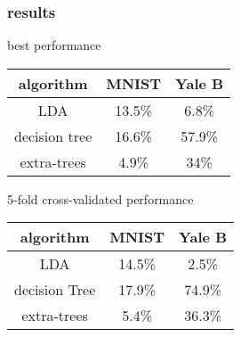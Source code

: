 \begin{frame}
  \frametitle{results}

best performance
  \begin{table}[H]
  \centering
  \begin{tabular}{||c | c | c||} 
    \hline
    algorithm & MNIST & Yale B \\
    \hline\hline
    LDA & 13.5\%  & 6.8\% \\ 
    \hline
    decision tree & 16.6\% & 57.9\% \\ 
    \hline
    extra-trees & 4.9\% & 34\% \\
    \hline
  \end{tabular}
\end{table}
5-fold cross-validated performance
%
\begin{table}[H]
  \centering
  \begin{tabular}{||c | c | c||} 
    \hline
    algorithm & MNIST & Yale B \\
    \hline\hline
    LDA & 14.5\%  & 2.5\% \\ 
    \hline
    decision Tree & 17.9\% & 74.9\% \\ 
    \hline
    extra-trees & 5.4\% & 36.3\% \\
    \hline
  \end{tabular}
\end{table}

\end{frame}